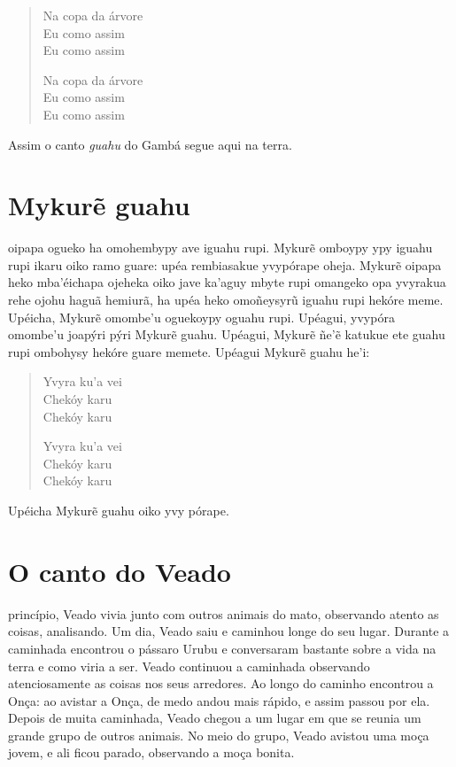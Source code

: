 \begin{verse}
Na copa da árvore\\
Eu como assim\\
Eu como assim

Na copa da árvore\\
Eu como assim\\
Eu como assim
\end{verse}

Assim o canto \textit{guahu} do Gambá segue aqui na terra.

\chapter{Mykurẽ guahu}

 oipapa ogueko ha omohembypy ave iguahu rupi. Mykurẽ omboypy ypy
iguahu rupi ikaru oiko ramo guare: upéa rembiasakue yvypórape oheja.
Mykurẽ oipapa heko mba'éichapa ojeheka oiko jave ka'aguy mbyte rupi
omangeko opa yvyrakua rehe ojohu haguã hemiurã, ha upéa heko omoñeysyrũ
iguahu rupi hekóre meme. Upéicha, Mykurẽ omombe'u oguekoypy oguahu rupi.
Upéagui, yvypóra omombe'u joapýri pýri Mykurẽ guahu. Upéagui, Mykurẽ
ñe'ẽ katukue ete guahu rupi ombohysy hekóre guare memete. Upéagui Mykurẽ
guahu he'i:

\begin{verse}
Yvyra ku'a vei\\
Chekóy karu\\
Chekóy karu

Yvyra ku'a vei\\
Chekóy karu\\
Chekóy karu
\end{verse}
Upéicha Mykurẽ guahu oiko yvy pórape.


\chapter{O canto do Veado}

 princípio, Veado vivia junto com outros animais do mato, observando
atento as coisas, analisando. Um dia, Veado saiu e caminhou longe do seu
lugar. Durante a caminhada encontrou o pássaro Urubu e conversaram
bastante sobre a vida na terra e como viria a ser. Veado continuou a
caminhada observando atenciosamente as coisas nos seus arredores. Ao
longo do caminho encontrou a Onça: ao avistar a Onça, de medo andou mais
rápido, e assim passou por ela. Depois de muita caminhada, Veado chegou
a um lugar em que se reunia um grande grupo de outros animais. No meio
do grupo, Veado avistou uma moça jovem, e ali ficou parado, observando a
moça bonita.

